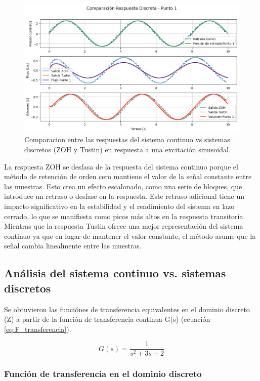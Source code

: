 \documentclass[journal]{IEEEtran}
\begin{document}
\begin{figure}[h!]
    \centering
    \includegraphics[width=1\linewidth]{Comparacion_P4.png}
    \caption{Comparacion entre las respuestas del sistema continuo vs sistemas discretos (ZOH y Tustin) en respuesta a una excitación sinusoidal.}
    \label{fig:simulacion_P4}
\end{figure}

La respuesta ZOH se desfasa de la respuesta del sistema continuo porque el método de retención de orden cero mantiene el valor de la señal constante entre las muestras. Esto crea un efecto escalonado, como una serie de bloques, que introduce un retraso o desfase en la respuesta. Este retraso adicional tiene un impacto significativo en la estabilidad y el rendimiento del sistema en lazo cerrado, lo que se manifiesta como picos más altos en la respuesta transitoria.
Mientras que la respuesta Tustin ofrece una mejor representación del sistema continuo ya que en lugar de mantener el valor constante, el método asume que la señal cambia linealmente entre las muestras.


\subsection{\textbf{Análisis del sistema continuo vs. sistemas discretos}}

Se obtuvieron las funciónes de transferencia equivalentes en el dominio discreto (Z) a partir de la función de transferencia continua G(s) (ecuación \ref{eq:F_transferencia}). 

\begin{equation}
    G(s) = \frac{1}{s^2 + 3s + 2}
    \label{eq:F_transferencia}
\end{equation}


\subsubsection{\textbf{Función de transferencia en el dominio discreto}}
\end{document}
